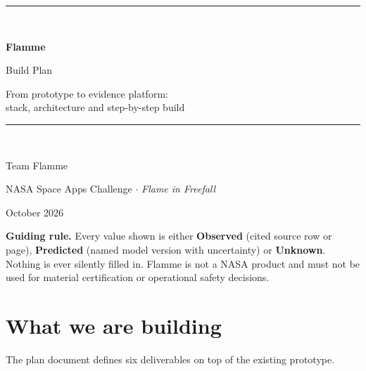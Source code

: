 \documentclass[11pt,a4paper]{article}
\begin{document}
\begin{titlepage}
\centering
\vspace*{3cm}
{\color{flame}\rule{\linewidth}{1.5pt}}\\[1em]
{\fontsize{34}{40}\selectfont\bfseries\color{ink} Flamme\par}
\vspace{0.4em}
{\LARGE Build Plan\par}
\vspace{0.8em}
{\large From prototype to evidence platform:\\ stack, architecture and step-by-step build\par}
{\color{flame}\rule{\linewidth}{1.5pt}}\\[2.5em]
{\large Team Flamme\par}
\vspace{0.3em}
NASA Space Apps Challenge $\cdot$ \emph{Flame in Freefall}\par
\vspace{0.3em}
October 2026\par
\vfill
\begin{keybox}
\small\textbf{Guiding rule.} Every value shown is either \textbf{Observed} (cited source row or page),
\textbf{Predicted} (named model version with uncertainty) or \textbf{Unknown}.
Nothing is ever silently filled in. Flamme is not a NASA product and must not be used for
material certification or operational safety decisions.
\end{keybox}
\end{titlepage}

\tableofcontents
\newpage

\section{What we are building}

The plan document defines six deliverables on top of the existing prototype.
\end{document}
